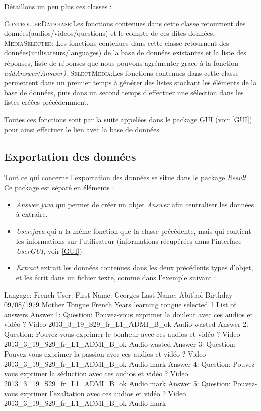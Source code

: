 Détaillons un peu plus ces classes :

\textsc{ControllerDatabase}:Les fonctions contenues dans cette classe retournent des données(audios/videos/questions) et le compte de ces dites données.
\textsc{MediaSelected}: Les fonctions contenues dans cette classe retournent des données(utilisateurs/languages) de la base de données existantes et la liste des réponses, liste de réponses que nous pouvons agrémenter grace à la fonction \textit{addAnswer(Answer)}.
\textsc{SelectMedia}:Les fonctions contenues dans cette classe permettent dans un premier temps à générer des listes stockant les éléments de la base de données, puis dans un second temps d'effectuer une sélection dans les listes créées précédemment.

Toutes ces fonctions sont par la suite appelées dans le package GUI (voir \ref{GUI}) pour ainsi effectuer le lien avec la base de données.

\subsection{Exportation des données}\label{export}

Tout ce qui concerne l'exportation des données se situe dans le package \textit{Result}. Ce package est séparé en 
 éléments :
 
 \begin{itemize}
  \item \textit{Answer.java} qui permet de créer un objet \textit{Answer} afin centraliser les données à extraire.
  \item \textit{User.java} qui a la même fonction que la classe précédente, mais qui contient les informations sur l'utilisateur (informations récupérées dans l'interface \textit{UserGUI}, voir \ref{GUI}).
  \item \textit{Extract} extrait les données contenues dans les deux précédents types d'objet, et les écrit dans un fichier texte, comme dans l'exemple suivant :
 \end{itemize}
 
 \begin{verbnobox}[\small]
  Langage:   French
  User:
      First Name:   Georges
      Last Name:   Abitbol
      Birthday   09/08/1979
      Mother Tongue   French
      Years learning tongue selected   1
  List of answers
      Answer 1:
	    Question:   Pouvez-vous exprimer la douleur avec ces audios et vidéo ?
	    Video   2013_3_19_S29_fr_L1_ADMI_B_ok
	    Audio   wasted
      Answer 2:
	    Question:   Pouvez-vous exprimer le bonheur avec ces audios et vidéo ?
	    Video   2013_3_19_S29_fr_L1_ADMI_B_ok
	    Audio   wasted
      Answer 3:
	    Question:   Pouvez-vous exprimer la passion avec ces audios et vidéo ?
	    Video   2013_3_19_S29_fr_L1_ADMI_B_ok
	    Audio   mark
      Answer 4:
	    Question:   Pouvez-vous exprimer la séduction avec ces audios et vidéo ?
	    Video   2013_3_19_S29_fr_L1_ADMI_B_ok
	    Audio   mark
      Answer 5:
	    Question:   Pouvez-vous exprimer l'exaltation avec ces audios et vidéo ?
	    Video   2013_3_19_S29_fr_L1_ADMI_B_ok
	    Audio   mark

 \end{verbnobox}



